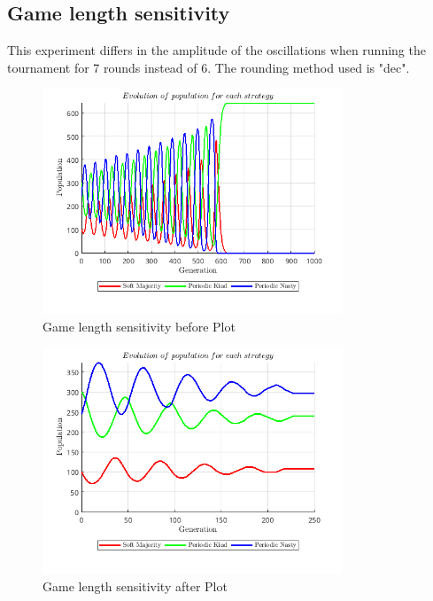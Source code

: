 \subsection{Game length sensitivity}
This experiment differs in the amplitude of the oscillations when running the tournament for 7 rounds instead of 6. The rounding method used is "dec".
\begin{figure}[H]
    \centering
    \includegraphics[width=0.8\textwidth]{media/meetings/game_length_sensitivity_before.png}
    \caption{Game length sensitivity before Plot}
\end{figure}
\begin{figure}[H]
    \centering
    \includegraphics[width=0.8\textwidth]{media/meetings/game_length_sensitivity_after.png}
    \caption{Game length sensitivity after Plot}
\end{figure}

